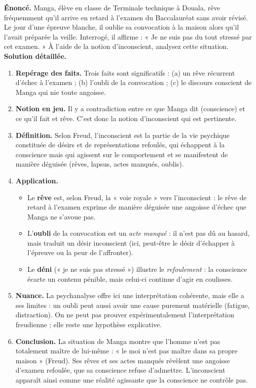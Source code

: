 \documentclass[11pt]{article}
\newcommand{\cle}[1]{{\popxbold\color{popdark}#1}}
\begin{document}
\begin{exoresolu}
\textbf{Énoncé.} Manga, élève en classe de Terminale technique à Douala, rêve fréquemment qu'il arrive en retard à l'examen du Baccalauréat sans avoir révisé. Le jour d'une épreuve blanche, il oublie sa convocation à la maison alors qu'il l'avait préparée la veille. Interrogé, il affirme : « Je ne suis pas du tout stressé par cet examen. » À l'aide de la notion d'inconscient, analysez cette situation.
\tcblower
\textbf{Solution détaillée.}
\begin{enumerate}
\item \textbf{Repérage des faits.} Trois faits sont significatifs : (a) un rêve récurrent d'échec à l'examen ; (b) l'oubli de la convocation ; (c) le discours conscient de Manga qui nie toute angoisse.
\item \textbf{Notion en jeu.} Il y a contradiction entre ce que Manga dit (conscience) et ce qu'il fait et rêve. C'est donc la notion d'\cle{inconscient} qui est pertinente.
\item \textbf{Définition.} Selon Freud, l'inconscient est la partie de la vie psychique constituée de désirs et de représentations refoulés, qui échappent à la conscience mais qui agissent sur le comportement et se manifestent de manière déguisée (rêves, lapsus, actes manqués, oublis).
\item \textbf{Application.}
\begin{itemize}
\item Le \textbf{rêve} est, selon Freud, la « voie royale » vers l'inconscient : le rêve de retard à l'examen exprime de manière déguisée une angoisse d'échec que Manga ne s'avoue pas.
\item L'\textbf{oubli} de la convocation est un \emph{acte manqué} : il n'est pas dû au hasard, mais traduit un désir inconscient (ici, peut-être le désir d'échapper à l'épreuve ou la peur de l'affronter).
\item Le \textbf{déni} (« je ne suis pas stressé ») illustre le \emph{refoulement} : la conscience écarte un contenu pénible, mais celui-ci continue d'agir en coulisses.
\end{itemize}
\item \textbf{Nuance.} La psychanalyse offre ici une interprétation cohérente, mais elle a ses limites : un oubli peut aussi avoir une cause purement matérielle (fatigue, distraction). On ne peut pas prouver expérimentalement l'interprétation freudienne ; elle reste une hypothèse explicative.
\item \textbf{Conclusion.} La situation de Manga montre que l'homme n'est pas totalement maître de lui-même : « le moi n'est pas maître dans sa propre maison » (Freud). Ses rêves et ses actes manqués révèlent une angoisse d'examen refoulée, que sa conscience refuse d'admettre. L'inconscient apparaît ainsi comme une réalité agissante que la conscience ne contrôle pas.
\end{enumerate}
\end{exoresolu}
\end{document}
